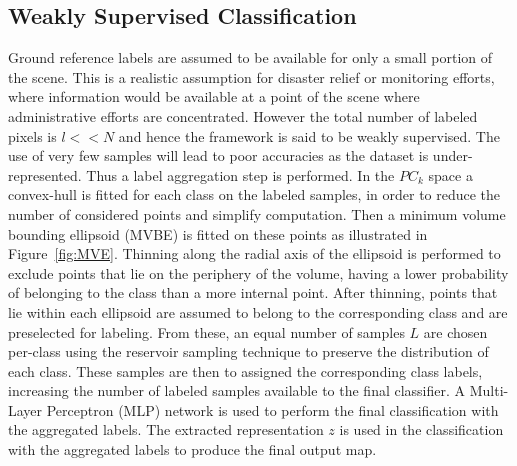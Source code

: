 \subsection{Weakly Supervised Classification}
\label{sub:weak}
Ground reference labels are assumed to be available for only a small portion of the scene. This is a realistic assumption for disaster relief or monitoring efforts, where information would be available at a point of the scene where administrative efforts are concentrated. However the total number of labeled pixels  is $l << N$ and hence the framework is said to be weakly supervised. The use of very few samples  will lead to poor accuracies as the dataset is under-represented. Thus a label aggregation step is performed. In the $PC_k$ space a convex-hull is fitted for each class on the labeled samples, in order to reduce the number of considered points and simplify computation. Then a minimum volume bounding ellipsoid (MVBE) is fitted on these points as illustrated in Figure~\ref{fig:MVE}. Thinning along the radial axis of the ellipsoid is performed to exclude points that lie on the periphery of the volume, having a lower probability of belonging to the class than a more internal point. After thinning, points that lie within each ellipsoid are assumed to belong to the corresponding class and are preselected for labeling. From these, an equal number of samples $L$ are chosen per-class using the reservoir sampling technique to preserve the distribution of each class. These  samples are then to assigned the corresponding class labels, increasing the number of labeled samples available to the final classifier.  
A Multi-Layer Perceptron (MLP) network is used to perform the final classification with the aggregated labels. The extracted representation $z$ is used in the classification with the aggregated labels to produce the final output map. %








